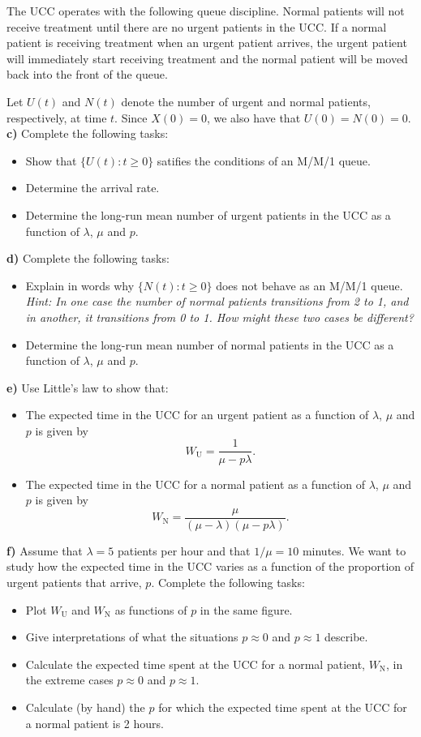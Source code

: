 \documentclass[1p]{article}		%
\begin{document}
The UCC operates with the following queue discipline. Normal patients will not receive treatment
until there are no urgent patients in the UCC. If a normal patient is receiving
treatment when an urgent patient arrives, the urgent patient will immediately start receiving
treatment and the normal patient will be moved back into the front of the queue. 

Let $U(t)$ and
$N(t)$ denote the number of urgent and normal patients, respectively, at time $t$. Since $X(0) = 0$, we also have that $U(0) = N(0) = 0$.
\newpage
\noindent\textbf{c)} Complete the following tasks:
\begin{itemize}
  \item Show that $\{U(t): t \geq 0\}$ satifies the conditions of an M/M/1 queue.
  \item Determine the arrival rate.
  \item Determine the long-run mean number of urgent patients in the UCC
        as a function of $\lambda$, $\mu$ and $p$.
\end{itemize}
\textbf{d)} Complete the following tasks:
\begin{itemize}
  \item
    Explain in words why $\{N(t): t \geq 0\}$ does not behave as an M/M/1 queue.\\
    \emph{Hint: In one case the number of normal patients transitions from 2 to 1, and in another, it transitions from 0 to 1. How might these two cases be different?}
  \item
    Determine the long-run mean number of normal patients in the UCC
    as a function of $\lambda$, $\mu$ and $p$. 
\end{itemize}
\textbf{e)} Use Little's law to show that:
\begin{itemize}
  \item The expected time in the UCC for an urgent patient as a function of $\lambda$, $\mu$ and
  $p$ is given by
  \[
    W_\mathrm{U} = \frac{1}{\mu-p\lambda}.
  \]
  \item The expected time in the UCC for a normal patient as a function of $\lambda$, $\mu$ and
  $p$ is given by
  \[
    W_\mathrm{N} = \frac{\mu}{(\mu-\lambda)(\mu-p\lambda)}.
  \]
\end{itemize}
\textbf{f)}
  Assume that $\lambda = 5$ patients per hour and that $1/\mu = 10$ minutes. We want to study
  how the expected time in the UCC varies as a function of the proportion of urgent
  patients that arrive, $p$. Complete the following tasks:
  \begin{itemize}
    \item
      Plot $W_\mathrm{U}$ and $W_\mathrm{N}$ as functions of $p$ in the same figure.
    \item
      Give interpretations of what the situations $p \approx 0$ and $p \approx 1$ describe.
    \item
      Calculate the expected time spent at the UCC for a normal patient, $W_\mathrm{N}$, in the extreme cases $p \approx 0$ and $p \approx 1$.
    \item 
      Calculate (by hand) the $p$ for which the expected time spent at the UCC for a normal
      patient is 2 hours.
  \end{itemize}
\end{document}
